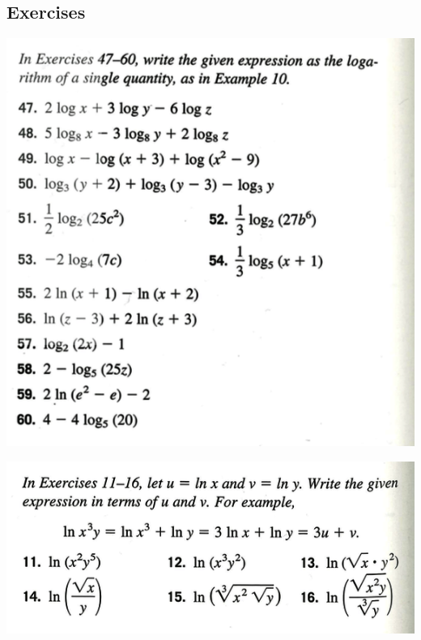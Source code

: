 \subsection{Exercises}
\includegraphics[scale=0.5]{ch07/0703xA.png}

\includegraphics[scale=0.5]{ch07/0703xB.png}


